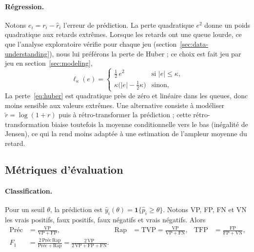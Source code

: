 \documentclass[11pt,a4paper]{article}
\newcommand{\ind}{\mathbf{1}}
\newcommand{\Preci}{\text{Préc}}
\newcommand{\Rapp}{\mathrm{Rap}}
\theoremstyle{definition}
\begin{document}
\paragraph{Régression.} Notons $e_i = r_i - \hat{r}_i$ l'erreur de prédiction. La perte quadratique $e^2$ donne un poids quadratique aux retards extrêmes. Lorsque les retards ont une queue lourde, ce que l'analyse exploratoire vérifie pour chaque jeu (section~\ref{sec:data-understanding}), nous lui préférons la perte de Huber \cite{huber1964robust} ; ce choix est fait jeu par jeu en section~\ref{sec:modeling},
\begin{equation}
  \ell_\kappa(e) =
  \begin{cases}
    \tfrac{1}{2}\, e^{2} & \text{si } |e| \le \kappa,\\[0.5ex]
    \kappa \bigl(|e| - \tfrac{1}{2}\kappa\bigr) & \text{sinon,}
  \end{cases}
  \label{eq:huber}
\end{equation}
La perte~\eqref{eq:huber} est quadratique près de zéro et linéaire dans les queues, donc moins sensible aux valeurs extrêmes. Une alternative consiste à modéliser $\tilde{r} = \log(1+r)$ puis à rétro-transformer la prédiction ; cette rétro-transformation biaise toutefois la moyenne conditionnelle vers le bas (inégalité de Jensen), ce qui la rend moins adaptée à une estimation de l'ampleur moyenne du retard.

\subsection{Métriques d'évaluation}
\label{sec:metriques}

\paragraph{Classification.} Pour un seuil $\theta$, la prédiction est $\hat{y}_i(\theta) = \ind\{\hat{p}_i \ge \theta\}$. Notons VP, FP, FN et VN les vrais positifs, faux positifs, faux négatifs et vrais négatifs. Alors
\begin{align}
  \Preci &= \frac{\mathrm{VP}}{\mathrm{VP}+\mathrm{FP}}, &
  \Rapp &= \mathrm{TVP} = \frac{\mathrm{VP}}{\mathrm{VP}+\mathrm{FN}}, &
  \mathrm{TFP} &= \frac{\mathrm{FP}}{\mathrm{FP}+\mathrm{VN}}, \label{eq:prf}\\
  F_1 &= \frac{2\,\Preci\,\Rapp}{\Preci+\Rapp} = \frac{2\,\mathrm{VP}}{2\,\mathrm{VP}+\mathrm{FP}+\mathrm{FN}}. \label{eq:f1}
\end{align}
\end{document}
